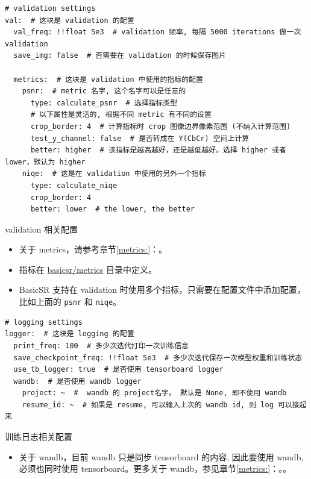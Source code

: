 \documentclass[../main.tex]{subfiles}
\begin{document}
\begin{verbatim}
# validation settings
val:  # 这块是 validation 的配置
  val_freq: !!float 5e3  # validation 频率, 每隔 5000 iterations 做一次 validation
  save_img: false  # 否需要在 validation 的时候保存图片

  metrics:  # 这块是 validation 中使用的指标的配置
    psnr:  # metric 名字, 这个名字可以是任意的
      type: calculate_psnr  # 选择指标类型
      # 以下属性是灵活的, 根据不同 metric 有不同的设置
      crop_border: 4  # 计算指标时 crop 图像边界像素范围 (不纳入计算范围)
      test_y_channel: false  # 是否转成在 Y(CbCr) 空间上计算
      better: higher  # 该指标是越高越好，还是越低越好。选择 higher 或者 lower，默认为 higher
    niqe:  # 这是在 validation 中使用的另外一个指标
      type: calculate_niqe
      crop_border: 4
      better: lower  # the lower, the better
\end{verbatim}

\begin{exampleBox}[righthand ratio=0.00, sidebyside, sidebyside align=center, lower separated=false]{validation 相关配置}
\begin{itemize}
    \item 关于 metrics，请参考章节\ref{metrics:}：。
    \item 指标在 \href{https://github.com/XPixelGroup/BasicSR/tree/master/basicsr/metrics}{basicsr/metrics} 目录中定义。
    \item BasicSR 支持在 validation 时使用多个指标，只需要在配置文件中添加配置，比如上面的 \texttt{psnr} 和 \texttt{niqe}。
\end{itemize}
\end{exampleBox}

\begin{verbatim}
# logging settings
logger:  # 这块是 logging 的配置
  print_freq: 100  # 多少次迭代打印一次训练信息
  save_checkpoint_freq: !!float 5e3  # 多少次迭代保存一次模型权重和训练状态
  use_tb_logger: true  # 是否使用 tensorboard logger
  wandb:  # 是否使用 wandb logger
    project: ~  #  wandb 的 project名字。 默认是 None, 即不使用 wandb
    resume_id: ~  # 如果是 resume, 可以输入上次的 wandb id, 则 log 可以接起来
\end{verbatim}

\begin{exampleBox}[righthand ratio=0.00, sidebyside, sidebyside align=center, lower separated=false]{训练日志相关配置}
\begin{itemize}
    \item 关于 wandb，目前 wandb 只是同步 tensorboard 的内容, 因此要使用 wandb, 必须也同时使用 tensorboard。更多关于 wandb，参见章节\ref{metrics:}：。。
\end{itemize}
\end{exampleBox}
\end{document}
